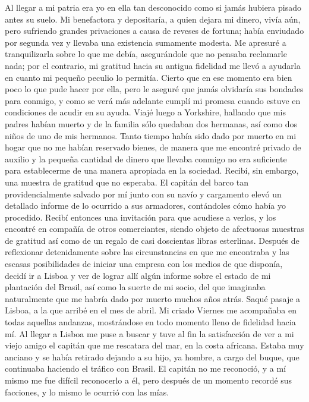 \documentclass{novela}
\begin{document}
    Al llegar a mi patria era yo en ella tan desconocido como si jamás hubiera pisado antes su suelo. Mi benefactora y depositaría, a quien dejara mi dinero, vivía aún, pero sufriendo grandes privaciones a causa de reveses de fortuna; había enviudado por segunda vez y llevaba una existencia sumamente modesta. Me apresuré a tranquilizarla sobre lo que me debía, asegurándole que no pensaba reclamarle nada; por el contrario, mi gratitud hacia su antigua fidelidad me llevó a ayudarla en cuanto mi pequeño peculio lo permitía. Cierto que en ese momento era bien poco lo que pude hacer por ella, pero le aseguré que jamás olvidaría sus bondades para conmigo, y como se verá más adelante cumplí mi promesa cuando estuve en condiciones de acudir en su ayuda.
    Viajé luego a Yorkshire, hallando que mis padres habían muerto y de la familia sólo quedaban dos hermanas, así como dos niños de uno de mis hermanos. Tanto tiempo había sido dado por muerto en mi hogar que no me habían reservado bienes, de manera que me encontré privado de auxilio y la pequeña cantidad de dinero que llevaba conmigo no era suficiente para establecerme de una manera apropiada en la sociedad.
    Recibí, sin embargo, una muestra de gratitud que no esperaba. El capitán del barco tan providencialmente salvado por mí junto con su navío y cargamento elevó un detallado informe de lo ocurrido a sus armadores, contándoles cómo había yo procedido. Recibí entonces una invitación para que acudiese a verlos, y los encontré en compañía de otros comerciantes, siendo objeto de afectuosas muestras de gratitud así como de un regalo de casi doscientas libras esterlinas.
    Después de reflexionar detenidamente sobre las circunstancias en que me encontraba y las escasas posibilidades de iniciar una empresa con los medios de que disponía, decidí ir a Lisboa y ver de lograr allí algún informe sobre el estado de mi plantación del Brasil, así como la suerte de mi socio, del que imaginaba naturalmente que me habría dado por muerto muchos años atrás.
    Saqué pasaje a Lisboa, a la que arribé en el mes de abril. Mi criado Viernes me acompañaba en todas aquellas andanzas, mostrándose en todo momento lleno de fidelidad hacia mí.
    Al llegar a Lisboa me puse a buscar y tuve al fin la satisfacción de ver a mi viejo amigo el capitán que me rescatara del mar, en la costa africana. Estaba muy anciano y se había retirado dejando a su hijo, ya hombre, a cargo del buque, que continuaba haciendo el tráfico con Brasil. El capitán no me reconoció, y a mí mismo me fue difícil reconocerlo a él, pero después de un momento recordé sus facciones, y lo mismo le ocurrió con las mías.
\end{document}
